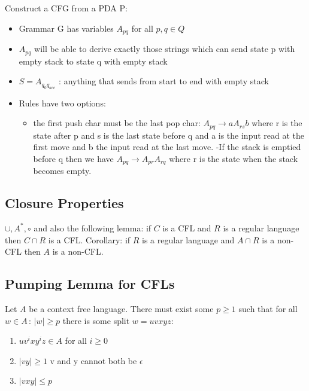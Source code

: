 Construct a CFG from a PDA P:

\begin{itemize}
\item Grammar G has variables $A_{pq}$ for all $p,q\in Q$

\item $A_{pq}$ will be able to derive exactly those strings which can send state p with empty stack to state q with empty stack

\item $S = A_{q_0q_{acc}}$ : anything that sends from start to end with empty stack

\item Rules have two options:

\begin{itemize}
\item the first push char must be the last pop char: $A_{pq} \to aA_{rs}b$ where r is the state after p and s is the last state before q and a is the input read at the first move and b the input read at the last move.
-{}If the stack is emptied before q then we have $ A_{pq} \to A_{pr}A_{rq} $ where r is the state when the stack becomes empty.

\end{itemize}

\end{itemize}

\subsection{Closure Properties}
\label{closureproperties}

$\cup,A^* ,\circ$ and also the following lemma: if $C$ is a CFL and $R$ is a regular language then $C\cap R$ is a CFL. Corollary: if $R$ is a regular language and $A\cap R$ is a non-{}CFL then $A$ is a non-{}CFL.

\subsection{Pumping Lemma for CFLs}
\label{pumpinglemmaforcfls}

Let $A$ be a context free language. There must exist some $p \geq 1 $ such that for all $w\in A\, :\, |w| \geq p$ there is some split $w = uvxyz$:

\begin{enumerate}
\item $ uv^ixy^iz \in A $ for all $i\geq 0$

\item $ |vy| \geq 1 $ v and y cannot both be $\epsilon$

\item $ |vxy| \leq p$

\end{enumerate}

